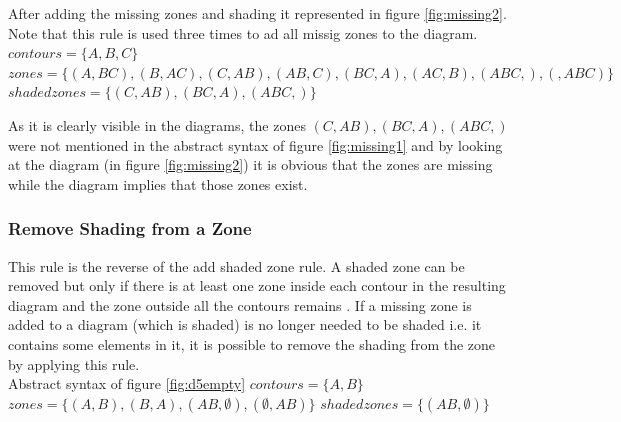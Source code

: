 \documentclass[10pt, a4paper, titlepage]{article}
\begin{document}
After adding the missing zones and shading it represented in figure \ref{fig:missing2}. Note that this rule  is used three times to ad all missig zones to the diagram.\newline
$contours =  \lbrace A, B, C \rbrace $ \newline
$zones = \lbrace (A , BC) , (B , AC), (C, AB), (AB , C) , (BC , A) , (AC, B), (ABC , ), (  , ABC) \rbrace  $ \newline 
$shaded zones = \lbrace (C, AB), (BC , A), (ABC , ) \rbrace  $ \newline

As it is clearly visible in the diagrams, the zones $(C, AB) , (BC, A), (ABC, )$ were not mentioned in the abstract syntax of figure \ref{fig:missing1} and by looking at the diagram (in figure \ref{fig:missing2}) it is obvious that the zones are missing while the diagram implies that those zones exist.

\subsubsection{Remove Shading from a Zone}

This rule is the reverse of the add shaded zone rule. A shaded zone can be removed but only if there is at least one zone inside each contour in the resulting diagram and the zone outside all the contours remains \cite{Fish_2007}. If a missing zone is added to a diagram (which is shaded) is no longer needed to be shaded i.e. it contains some elements in it, it is possible to remove the shading from the zone by applying this rule. 
\\

Abstract syntax of figure \ref{fig:d5empty}\newline
$contours =  \lbrace A, B \rbrace $ \newline
$zones = \lbrace (A , B) , (B , A), (AB , \emptyset) , (\emptyset , AB) \rbrace  $ \newline 
$shaded zones = \lbrace (AB , \emptyset) \rbrace  $ \newline
\end{document}
